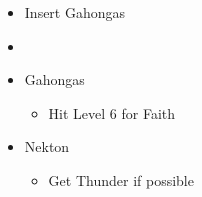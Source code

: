 \begin{menu}
	\begin{itemize}
		\paradigm
		\begin{itemize}
			\item Insert Gahongas
			\item {}%
			      {\paradigmline{\com}{\com}{\nek}{\X}}%
			      {\paradigmline{(\rav)}{(\rav)}{(\gah)}{\W}}%
			      {\paradigmline{\rav}{\sab}{\nek}{\W}}%
			      {\paradigmline{\sen}{\sen}{\nek}{\W}}%
			      {\paradigmline{\rav}{\rav}{\nek}{\W}}%
			      {\paradigmline[6]{\textit{\rav}}{\textit{\rav}}{\textit{\nek}}{\textit{\W}}}
		\end{itemize}
		\crystarium
		\begin{itemize}
			\item Gahongas
			      \begin{itemize}
				      \item Hit Level 6 for Faith
			      \end{itemize}
			\item Nekton
			      \begin{itemize}
				      \item Get Thunder if possible
			      \end{itemize}
		\end{itemize}
	\end{itemize}
\end{menu}